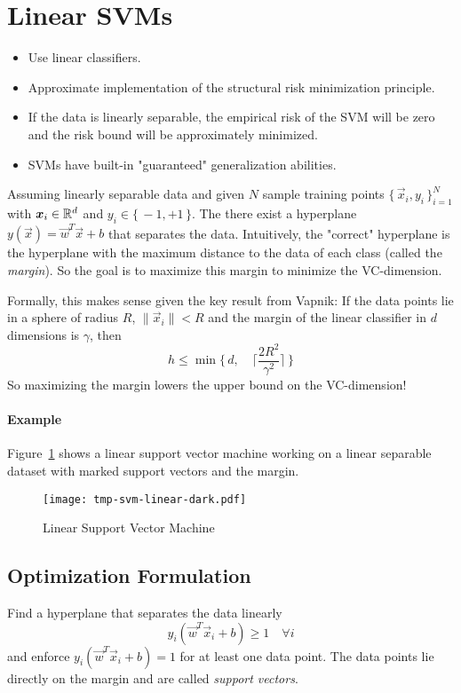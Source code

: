 	\section{Linear SVMs}
		\begin{itemize}
			\item Use linear classifiers.
			\item Approximate implementation of the structural risk minimization principle.
			\item If the data is linearly separable, the empirical risk of the SVM will be zero and the risk bound will be approximately minimized.
			\item SVMs have built-in "guaranteed" generalization abilities.
		\end{itemize}
	
		Assuming linearly separable data and given \(N\) sample training points \( \{\, \vec{x}_i, y_i \,\}_{i = 1}^N \) with \( \bm{x}_i \in \mathbb{R}^d \) and \( y_i \in \{\, -1, +1 \,\} \). The there exist a hyperplane \( y(\vec{x}) = \vec{w}^T \vec{x} + b \) that separates the data. Intuitively, the "correct" hyperplane is the hyperplane with the maximum distance to the data of each class (called the \emph{margin}). So the goal is to maximize this margin to minimize the VC-dimension.
		
		Formally, this makes sense given the key result from Vapnik: If the data points lie in a sphere of radius \(R\), \( \lVert \vec{x}_i \rVert < R \) and the margin of the linear classifier in \(d\) dimensions is \(\gamma\), then
		\begin{equation}
			h \leq \min\Bigg\{\, d, \quad \bigg\lceil \frac{2R^2}{\gamma^2} \bigg\rceil \,\Bigg\}
		\end{equation}
		So maximizing the margin lowers the upper bound on the VC-dimension!
		
		\paragraph{Example}
			Figure~\ref{fig:svm} shows a linear support vector machine working on a linear separable dataset with marked support vectors and the margin.
			
			\begin{figure}
				\centering
				\texttt{[image: tmp-svm-linear-dark.pdf]}
				\caption{Linear Support Vector Machine}
				\label{fig:svm}
			\end{figure}

		\subsection{Optimization Formulation}
			Find a hyperplane that separates the data linearly
			\begin{equation}
				y_i (\vec{w}^T \vec{x}_i + b) \geq 1 \quad\forall i
			\end{equation}
			and enforce \( y_i (\vec{w}^T \vec{x}_i + b) = 1 \) for at least one data point. The data points lie directly on the margin and are called \emph{support vectors}.
			
